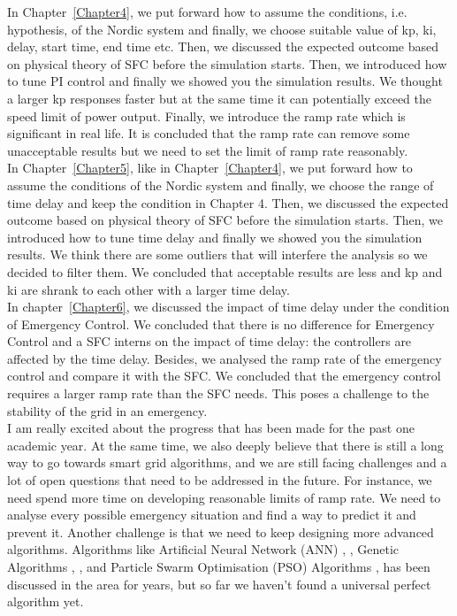 In Chapter~\ref{Chapter4}, we put forward how to assume the conditions, i.e. hypothesis, of the Nordic system and finally, we choose suitable value of kp, ki, delay, start time, end time etc. Then, we discussed the expected outcome based on physical theory of SFC before the simulation starts. Then, we introduced how to tune PI control and finally we showed you the simulation results. We thought a larger kp responses faster but at the same time it can potentially exceed the speed limit of power output. Finally, we introduce the ramp rate which is significant in real life. It is concluded that the ramp rate can remove some unacceptable results but we need to set the limit of ramp rate reasonably.\\

In Chapter~\ref{Chapter5}, like in Chapter~\ref{Chapter4}, we put forward how to assume the conditions of the Nordic system and finally, we choose the range of time delay and keep the condition in Chapter 4. Then, we discussed the expected outcome based on physical theory of SFC before the simulation starts. Then, we introduced how to tune time delay and finally we showed you the simulation results. We think there are some outliers that will interfere the analysis so we decided to filter them. We concluded that acceptable results are less and kp and ki are shrank to each other with a larger time delay. \\

In chapter~\ref{Chapter6}, we discussed the impact of time delay under the condition of  Emergency Control. We concluded that there is no difference for Emergency Control and a SFC interns on the impact of time delay: the controllers are affected by the time delay. Besides, we analysed the ramp rate of the emergency control and compare it with the SFC. We concluded that the emergency control requires a larger ramp rate than the SFC needs. This poses a challenge to the stability of the grid in an emergency.\\

I am really excited about the progress that has been made for the past one academic year. At the same time, we also deeply believe that there is still a long way to go towards smart grid algorithms, and we are still facing challenges and a lot of open questions that need to be addressed in the future. For instance, we need spend more time on developing reasonable limits of ramp rate. We need to analyse every possible emergency situation and find a way to predict it and prevent it. Another challenge is that we need to keep designing more advanced algorithms. Algorithms like Artificial Neural Network (ANN) \cite{pandey2013literature}, \cite{chaturvedi1999load}, Genetic Algorithms \cite{pandey2013literature}, \cite{dangprasert1996genetic}, \cite{rerkpreedapong2003robust} and Particle Swarm Optimisation (PSO) Algorithms \cite{pandey2013literature}, \cite{hosseini2008adaptive} has been discussed in the area for years, but so far we haven't found a universal perfect algorithm yet.\\